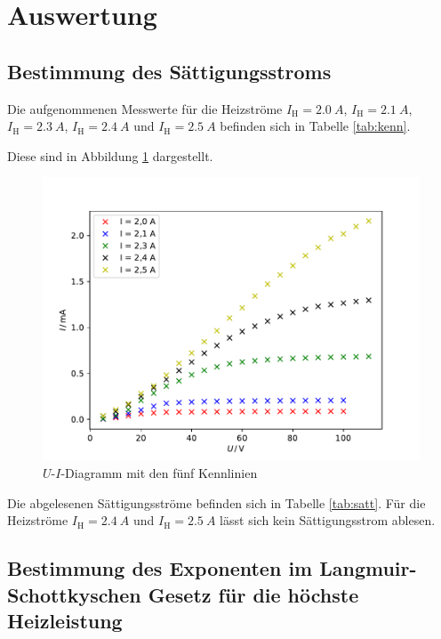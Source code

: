 \section{Auswertung}

\subsection{Bestimmung des Sättigungsstroms \label{sec:kenn}}

Die aufgenommenen Messwerte für die Heizströme $I_\text{H} = \SI{2,0}{A}$, $I_\text{H} = \SI{2,1}{A}$, $I_\text{H} = \SI{2,3}{A}$,
$I_\text{H} = \SI{2,4}{A}$ und $I_\text{H} = \SI{2,5}{A}$ befinden sich in Tabelle \ref{tab:kenn}.


\newpage
Diese sind in Abbildung \ref{fig:kenn} dargestellt.
\begin{figure}[H]
  \centering
  \includegraphics[width=\textwidth]{Plots/kenn.pdf}
  \caption{$U$-$I$-Diagramm mit den fünf Kennlinien}
  \label{fig:kenn}
\end{figure}

Die abgelesenen Sättigungsströme befinden sich in Tabelle \ref{tab:satt}. Für die Heizströme $I_\text{H} = \SI{2,4}{A}$ und $I_\text{H} = \SI{2,5}{A}$
lässt sich kein Sättigungsstrom ablesen.


\subsection{Bestimmung des Exponenten im Langmuir-Schottkyschen Gesetz für die höchste Heizleistung}

